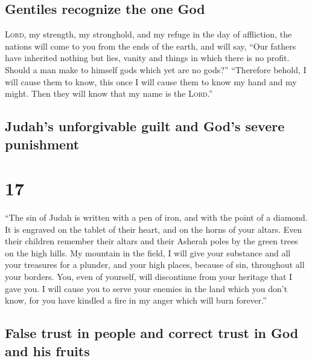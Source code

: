 \hypertarget{gentiles-recognize-the-one-god}{%
\subsection{Gentiles recognize the one
God}\label{gentiles-recognize-the-one-god}}

 \textsc{Lord}, my strength, my stronghold, and my refuge
in the day of affliction, the nations will come to you from the ends of
the earth, and will say, ``Our fathers have inherited nothing but lies,
vanity and things in which there is no profit.  Should a
man make to himself gods which yet are no gods?'' 
``Therefore behold, I will cause them to know, this once I will cause
them to know my hand and my might. Then they will know that my name is
the \textsc{Lord}.''

\hypertarget{judahs-unforgivable-guilt-and-gods-severe-punishment}{%
\subsection{Judah's unforgivable guilt and God's severe
punishment}\label{judahs-unforgivable-guilt-and-gods-severe-punishment}}

\hypertarget{section-16}{%
\section{17}\label{section-16}}

 ``The sin of Judah is written with a pen of iron, and
with the point of a diamond. It is engraved on the tablet of their
heart, and on the horns of your altars.  Even their
children remember their altars and their Asherah poles by the green
trees on the high hills.  My mountain in the field, I will
give your substance and all your treasures for a plunder, and your high
places, because of sin, throughout all your borders.  You,
even of yourself, will discontinue from your heritage that I gave you. I
will cause you to serve your enemies in the land which you don't know,
for you have kindled a fire in my anger which will burn forever.''

\hypertarget{false-trust-in-people-and-correct-trust-in-god-and-his-fruits}{%
\subsection{False trust in people and correct trust in God and his
fruits}\label{false-trust-in-people-and-correct-trust-in-god-and-his-fruits}}

